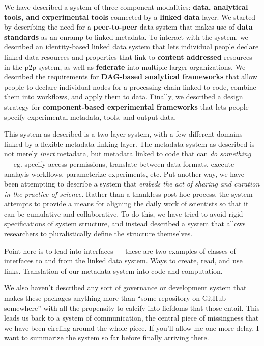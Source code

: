 We have described a system of three component modalities: \textbf{data,
analytical tools, and experimental tools} connected by a \textbf{linked
data} layer. We started by describing the need for a
\textbf{peer-to-peer} data system that makes use of \textbf{data
standards} as an onramp to linked metadata. To interact with the system,
we described an identity-based linked data system that lets individual
people declare linked data resources and properties that link to
\textbf{content addressed} resources in the p2p system, as well as
\textbf{federate} into multiple larger organizations. We described the
requirements for \textbf{DAG-based analytical frameworks} that allow
people to declare individual nodes for a processing chain linked to
code, combine them into workflows, and apply them to data. Finally, we
described a design strategy for \textbf{component-based experimental
frameworks} that lets people specify experimental metadata, tools, and
output data.

This system as described is a two-layer system, with a few different
domains linked by a flexible metadata linking layer. The metadata system
as described is not merely \emph{inert} metadata, but metadata linked to
code that can \emph{do something} --- eg. specify access permissions,
translate between data formats, execute analayis workflows, parameterize
experiments, etc. Put another way, we have been attempting to describe a
system that \emph{embeds the act of sharing and curation in the practice
of science.} Rather than a thankless post-hoc process, the system
attempts to provide a means for aligning the daily work of scientists so
that it can be cumulative and collaborative. To do this, we have tried
to avoid rigid specifications of system structure, and instead described
a system that allows researchers to pluralistically define the structure
themselves.

Point here is to lead into interfaces --- these are two examples of
classes of interfaces to and from the linked data system. Ways to
create, read, and use links. Translation of our metadata system into
code and computation.

We also haven't described any sort of governance or development system
that makes these packages anything more than ``some repository on GitHub
somewhere'' with all the propensity to calcify into fiefdoms that those
entail. This leads us back to a system of communication, the central
piece of missingness that we have been circling around the whole piece.
If you'll allow me one more delay, I want to summarize the system so far
before finally arriving there.

